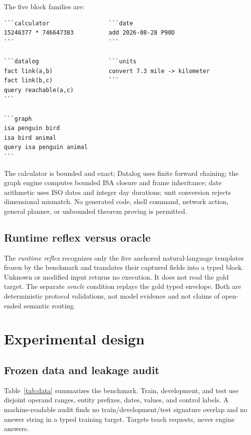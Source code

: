 \documentclass[10pt]{article}
\begin{document}
The five block families are:

\begin{verbatim}
```calculator                 ```date
15246377 * 746647383          add 2026-08-28 P90D
```                           ```

```datalog                    ```units
fact link(a,b)                convert 7.3 mile -> kilometer
fact link(b,c)                ```
query reachable(a,c)
```

```graph
isa penguin bird
isa bird animal
query isa penguin animal
```
\end{verbatim}

The calculator is bounded and exact; Datalog uses finite forward chaining; the
graph engine computes bounded ISA closure and frame inheritance; date arithmetic
uses ISO dates and integer day durations; unit conversion rejects dimensional
mismatch.  No generated code, shell command, network action, general planner, or
unbounded theorem proving is permitted.

\subsection{Runtime reflex versus oracle}

The \emph{runtime reflex} recognizes only the five anchored natural-language
templates frozen by the benchmark and translates their captured fields into a
typed block.  Unknown or modified input returns no execution.  It does not read
the gold target.  The separate \emph{oracle} condition replays the gold typed
envelope.  Both are deterministic protocol validations, not model evidence and
not claims of open-ended semantic routing.

\section{Experimental design}

\subsection{Frozen data and leakage audit}

Table~\ref{tab:data} summarizes the benchmark.  Train, development, and test use
disjoint operand ranges, entity prefixes, dates, values, and control labels.  A
machine-readable audit finds no train/development/test signature overlap and no
answer string in a typed training target.  Targets teach requests, never engine
answers.
\end{document}
